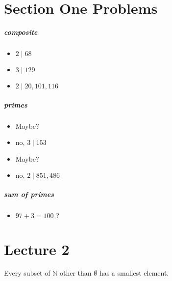 \documentclass[11pt]{book}
\begin{document}

\chapter{Section One Problems}%
\label{chp:section_one_problems}

\paragraph{composite} 
\begin{itemize}
    \item $2\mid 68$ 
    \item $3\mid 129$
    \item $2\mid 20,101,116$  
\end{itemize}

\paragraph{primes} 
\begin{itemize}
    \item Maybe?
    \item no, $3 \mid 153$ 
    \item Maybe?
    \item no, $2 \mid 851, 486$ 
\end{itemize}

\paragraph{sum of primes} 
\begin{itemize}
    \item $97 + 3= 100$ ?
\end{itemize}



\chapter{Lecture 2}%
\label{chp:lecture_2}

\begin{defn}\label{defn:well_ordering_principle}
   Every subset of $\mathbb{N} $ other than $\emptyset $ has a smallest      element. 
\end{defn}
\end{document}
